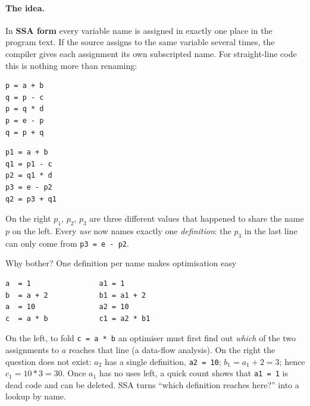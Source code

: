 \documentclass[11pt,a4paper]{article}
\begin{document}
\paragraph{The idea.} In \textbf{SSA form} every variable name is assigned in exactly one place in the program text. If the source assigns to the same variable several times, the compiler gives each assignment its own subscripted name. For straight-line code this is nothing more than renaming:
\begin{center}
\begin{minipage}[t]{0.40\textwidth}
\begin{lstlisting}
p = a + b
q = p - c
p = q * d
p = e - p
q = p + q
\end{lstlisting}
\end{minipage}\hfill
\begin{minipage}[t]{0.40\textwidth}
\begin{lstlisting}
p1 = a + b
q1 = p1 - c
p2 = q1 * d
p3 = e - p2
q2 = p3 + q1
\end{lstlisting}
\end{minipage}
\end{center}
On the right $p_1$, $p_2$, $p_3$ are three different values that happened to share the name $p$ on the left. Every \emph{use} now names exactly one \emph{definition}: the $p_3$ in the last line can only come from \texttt{p3 = e - p2}.

\begin{examplebox}{Why bother? One definition per name makes optimisation easy}
\begin{lstlisting}
a  = 1                a1 = 1
b  = a + 2            b1 = a1 + 2
a  = 10               a2 = 10
c  = a * b            c1 = a2 * b1
\end{lstlisting}
On the left, to fold \texttt{c = a * b} an optimiser must first find out \emph{which} of the two assignments to $a$ reaches that line (a data-flow analysis). On the right the question does not exist: $a_2$ has a single definition, \texttt{a2 = 10}; $b_1=a_1+2=3$; hence $c_1=10*3=30$. Once $a_1$ has no uses left, a quick count shows that \texttt{a1 = 1} is dead code and can be deleted. SSA turns ``which definition reaches here?'' into a lookup by name.
\end{examplebox}
\end{document}
